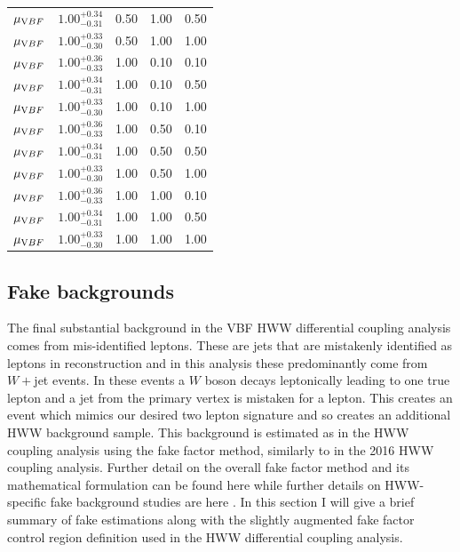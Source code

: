 \begin{table}
\begin{tabular}{l c c c c}
$\mu_{\text VBF}$&  $1.00^{+0.34}_{-0.31}$ & 0.50 & 1.00 & 0.50 \\ 
$\mu_{\text VBF}$&  $1.00^{+0.33}_{-0.30}$ & 0.50 & 1.00 & 1.00 \\ 
$\mu_{\text VBF}$&  $1.00^{+0.36}_{-0.33}$ & 1.00 & 0.10 & 0.10 \\ 
$\mu_{\text VBF}$&  $1.00^{+0.34}_{-0.31}$ & 1.00 & 0.10 & 0.50 \\ 
$\mu_{\text VBF}$&  $1.00^{+0.33}_{-0.30}$ & 1.00 & 0.10 & 1.00 \\ 
$\mu_{\text VBF}$&  $1.00^{+0.36}_{-0.33}$ & 1.00 & 0.50 & 0.10 \\ 
$\mu_{\text VBF}$&  $1.00^{+0.34}_{-0.31}$ & 1.00 & 0.50 & 0.50 \\ 
$\mu_{\text VBF}$&  $1.00^{+0.33}_{-0.30}$ & 1.00 & 0.50 & 1.00 \\ 
$\mu_{\text VBF}$&  $1.00^{+0.36}_{-0.33}$ & 1.00 & 1.00 & 0.10 \\ 
$\mu_{\text VBF}$&  $1.00^{+0.34}_{-0.31}$ & 1.00 & 1.00 & 0.50 \\ 
$\mu_{\text VBF}$&  $1.00^{+0.33}_{-0.30}$ & 1.00 & 1.00 & 1.00 \\ 
\end{tabular}
\label{tab:ggFBias}
\end{table}

\subsection{Fake backgrounds}
The final substantial background in the VBF HWW differential coupling analysis comes from mis-identified leptons. These are jets that are mistakenly identified as leptons in reconstruction and in this analysis these predominantly come from $W+$jet events. In these events a $W$ boson decays leptonically leading to one true lepton and a jet from the primary vertex is mistaken for a lepton. This creates an event which mimics our desired two lepton signature and so creates an additional HWW background sample. This background is estimated as in the HWW coupling analysis using the fake factor method, similarly to in the 2016 HWW coupling analysis. Further detail on the overall fake factor method and its mathematical formulation can be found here \cite{fakesfactormethod} while further details on HWW-specific fake background studies are here \cite{HWWCoupling}. In this section I will give a brief summary of fake estimations along with the slightly augmented fake factor control region definition used in the HWW differential coupling analysis. 


